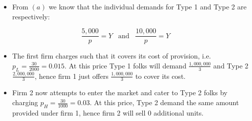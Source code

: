 \documentclass[]{article}
\providecommand{\tightlist}{%
  \setlength{\itemsep}{0pt}\setlength{\parskip}{0pt}}
\begin{document}
\begin{itemize}
\tightlist
\item
  From \((a)\) we know that the individual demands for Type 1 and Type 2
  are respectively:
\end{itemize}

\[\frac{5,000}{p} = Y \hspace{10pt} \text{and} \hspace{10pt} \frac{10,000}{p} = Y\]

\begin{itemize}
\item
  The first firm charges such that it covers its cost of provision, i.e.
  \(p_L=\frac{30}{2000}=0.015\). At this price Type 1 folks will demand
  \(\frac{1,000,000}{3}\) and Type 2 \(\frac{2,000,000}{3}\), hence firm
  1 just offers \(\frac{1,000,000}{3}\) to cover its cost.
\item
  Firm 2 now attempts to enter the market and cater to Type 2 folks by
  charging \(p_H=\frac{30}{1000}=0.03\). At this price, Type 2 demand
  the same amount provided under firm 1, hence firm 2 will sell 0
  additional units.
\end{itemize}
\end{document}
